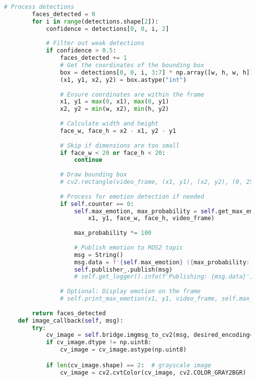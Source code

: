 \begin{lstlisting}[language=Python, caption={Python skript pre rozpoznávanie emócií}, label={lst:emotion-recognition}]
        # Process detections
        faces_detected = 0
        for i in range(detections.shape[2]):
            confidence = detections[0, 0, i, 2]
            
            # Filter out weak detections
            if confidence > 0.5:
                faces_detected += 1
                # Get the coordinates of the bounding box
                box = detections[0, 0, i, 3:7] * np.array([w, h, w, h])
                (x1, y1, x2, y2) = box.astype("int")
                
                # Ensure coordinates are within the frame
                x1, y1 = max(0, x1), max(0, y1)
                x2, y2 = min(w, x2), min(h, y2)
                
                # Calculate width and height
                face_w, face_h = x2 - x1, y2 - y1
                
                # Skip if dimensions are too small
                if face_w < 20 or face_h < 20:
                    continue
                    
                # Draw bounding box
                # cv2.rectangle(video_frame, (x1, y1), (x2, y2), (0, 255, 0), 2)
                
                # Process for emotion detection if needed
                if self.counter == 0:
                    self.max_emotion, max_probability = self.get_max_emotion(
                        x1, y1, face_w, face_h, video_frame)
                    
                    max_probability *= 100
                    
                    # Publish emotion to ROS2 topic
                    msg = String()
                    msg.data = f'{self.max_emotion} ({max_probability:.2f}%)'
                    self.publisher_.publish(msg)
                    # self.get_logger().info(f'Publishing: {msg.data}')
                
                # Optional: Display emotion on the frame
                # self.print_max_emotion(x1, y1, video_frame, self.max_emotion)
        
        return faces_detected
    def image_callback(self, msg):
        try:
            cv_image = self.bridge.imgmsg_to_cv2(msg, desired_encoding='bgr8')
            if cv_image.dtype != np.uint8:
                cv_image = cv_image.astype(np.uint8)

            if len(cv_image.shape) == 2:  # grayscale image
                cv_image = cv2.cvtColor(cv_image, cv2.COLOR_GRAY2BGR)


\end{lstlisting}
